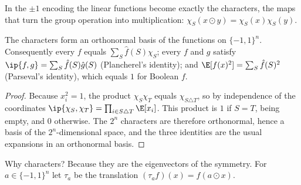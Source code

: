 \begin{refsection}

In the $\pm1$ encoding the linear functions become exactly the characters, the maps that turn the group operation into multiplication: $\chi_S(x\odot y)=\chi_S(x)\chi_S(y)$.

\begin{theorem}\label{thm:fourier:walsh}
The characters form an orthonormal basis of the functions on $\{-1,1\}^n$. Consequently every $f$ equals $\sum_S\hat f(S)\chi_S$; every $f$ and $g$ satisfy $\ip{f,g}=\sum_S\hat f(S)\hat g(S)$ (Plancherel's identity); and $\E[f(x)^2]=\sum_S\hat f(S)^2$ (Parseval's identity), which equals $1$ for Boolean $f$.
\end{theorem}

\begin{proof}
Because $x_i^2=1$, the product $\chi_S\chi_T$ equals $\chi_{S\triangle T}$, so by independence of the coordinates $\ip{\chi_S,\chi_T}=\prod_{i\in S\triangle T}\E[x_i]$. This product is $1$ if $S=T$, being empty, and $0$ otherwise. The $2^n$ characters are therefore orthonormal, hence a basis of the $2^n$-dimensional space, and the three identities are the usual expansions in an orthonormal basis.
\end{proof}

Why characters? Because they are the eigenvectors of the symmetry. For $a\in\{-1,1\}^n$ let $\tau_a$ be the translation $(\tau_af)(x)=f(a\odot x)$.



\end{refsection}

